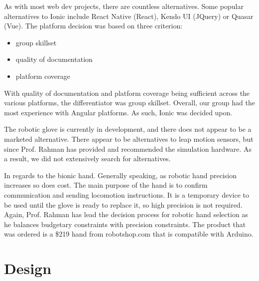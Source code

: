 \documentclass[a4paper,10pt]{article}
\begin{document}
        As with most web dev projects, there are countless alternatives. Some popular alternatives to Ionic include React Native (React), Kendo UI (JQuery) or Quasar (Vue). The platform decision was based on three criterion: 
        \begin{itemize}
         \item group skillset
         \item quality of documentation
         \item platform coverage
        \end{itemize}
        With quality of documentation and platform coverage being sufficient across the various platforms, the differentiator was group skillset. Overall, our group had the most experience with Angular platforms. As such, Ionic was decided upon.
        
        The robotic glove is currently in development, and there does not appear to be a marketed alternative. There appear to be alternatives to leap motion sensors, but since Prof. Rahman has provided and recommended the simulation hardware. As a result, we did not extensively search for alternatives. 
        
        In regards to the bionic hand. Generally speaking, as robotic hand precision increases so does cost. The main purpose of the hand is to confirm communication and sending locomotion instructions. It is a temporary device to be used until the glove is ready to replace it, so high precision is not required.  Again, Prof. Rahman has lead the decision process for robotic hand selection as he balances budgetary constraints with precision constraints. The product that was ordered is a \$219 hand from robotshop.com that is compatible with Arduino.

\section{Design}
\end{document}
